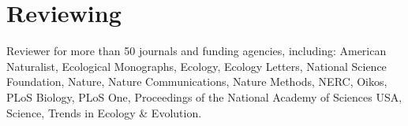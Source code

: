 \documentclass[11pt,letterpaper]{moderncv}
\begin{document}
\section{Reviewing}
Reviewer for more than 50 journals and funding agencies, including:
American Naturalist, Ecological Monographs,
Ecology, Ecology Letters, National Science Foundation, Nature, Nature
Communications, Nature Methods, NERC, Oikos, PLoS Biology, PLoS One,
Proceedings of the National Academy of Sciences USA, Science, Trends in Ecology \&
Evolution.
\end{document}
